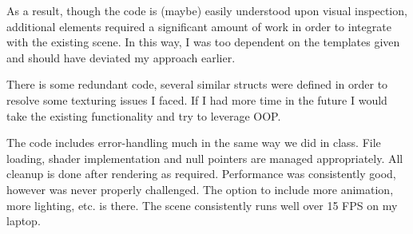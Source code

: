 As a result, though the code is (maybe) easily understood upon visual inspection, additional elements required a significant amount of work in order to integrate with the existing scene. In this way, I was too dependent on the templates given and should have deviated my approach earlier.

There is some redundant code, several similar structs were defined in order to resolve some texturing issues I faced. If I had more time in the future I would take the existing functionality and try to leverage OOP.



The code includes error-handling much in the same way we did in class. File loading, shader implementation and null pointers are managed appropriately. All cleanup is done after rendering as required. Performance was consistently good, however was never properly challenged. The option to include more animation, more lighting, etc. is there. The scene consistently runs well over 15 FPS on my laptop.